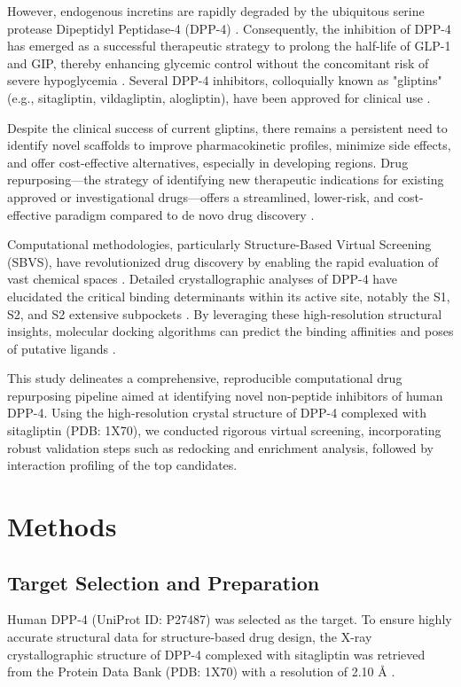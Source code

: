 \documentclass[12pt]{article}
\begin{document}
However, endogenous incretins are rapidly degraded by the ubiquitous serine protease Dipeptidyl Peptidase-4 (DPP-4) \citep{Thornberry2009}. Consequently, the inhibition of DPP-4 has emerged as a successful therapeutic strategy to prolong the half-life of GLP-1 and GIP, thereby enhancing glycemic control without the concomitant risk of severe hypoglycemia \citep{Deacon2011}. Several DPP-4 inhibitors, colloquially known as "gliptins" (e.g., sitagliptin, vildagliptin, alogliptin), have been approved for clinical use \citep{Kim2005, Feng2007, Eckhardt2007}.

Despite the clinical success of current gliptins, there remains a persistent need to identify novel scaffolds to improve pharmacokinetic profiles, minimize side effects, and offer cost-effective alternatives, especially in developing regions. Drug repurposing—the strategy of identifying new therapeutic indications for existing approved or investigational drugs—offers a streamlined, lower-risk, and cost-effective paradigm compared to de novo drug discovery \citep{Lipinski2001}.

Computational methodologies, particularly Structure-Based Virtual Screening (SBVS), have revolutionized drug discovery by enabling the rapid evaluation of vast chemical spaces \citep{Trott2010}. Detailed crystallographic analyses of DPP-4 have elucidated the critical binding determinants within its active site, notably the S1, S2, and S2 extensive subpockets \citep{Nabeno2013, Berger2018}. By leveraging these high-resolution structural insights, molecular docking algorithms can predict the binding affinities and poses of putative ligands \citep{Eberhardt2021}.

This study delineates a comprehensive, reproducible computational drug repurposing pipeline aimed at identifying novel non-peptide inhibitors of human DPP-4. Using the high-resolution crystal structure of DPP-4 complexed with sitagliptin (PDB: 1X70), we conducted rigorous virtual screening, incorporating robust validation steps such as redocking and enrichment analysis, followed by interaction profiling of the top candidates.

\section{Methods}

\subsection{Target Selection and Preparation}
Human DPP-4 (UniProt ID: P27487) was selected as the target. To ensure highly accurate structural data for structure-based drug design, the X-ray crystallographic structure of DPP-4 complexed with sitagliptin was retrieved from the Protein Data Bank (PDB: 1X70) with a resolution of 2.10 \AA{} \citep{Kim2005}. 
\end{document}
